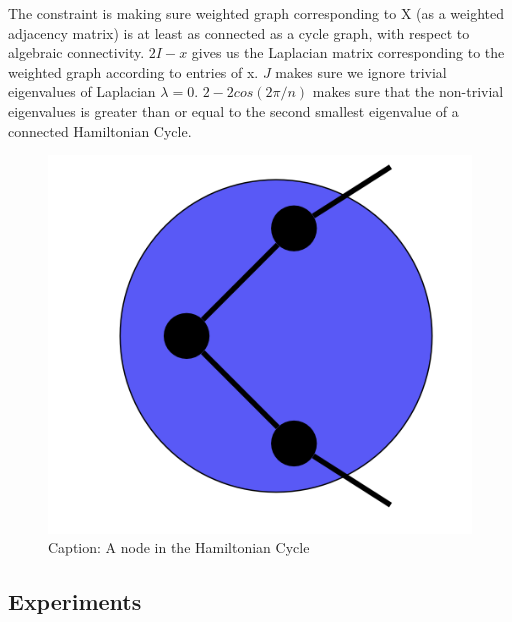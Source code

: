 \documentclass{article}
\begin{document}
The constraint is making sure weighted graph corresponding to X (as a weighted adjacency matrix) is at least as connected as a cycle graph, with respect to algebraic connectivity. $2I-x$ gives us the Laplacian matrix corresponding to the weighted graph according to entries of x. $J$ makes sure we ignore trivial eigenvalues of Laplacian $\lambda = 0$. $2-2cos(2\pi/n)$ makes sure that the non-trivial eigenvalues is greater than or equal to the second smallest eigenvalue of a connected Hamiltonian Cycle.
\begin{figure}[!ht]
    \centering
    \includegraphics{assets/degrees.png}
    \caption{Caption: A node in the Hamiltonian Cycle}
    \label{fig:degrees}
\end{figure}

\subsection{Experiments}
\end{document}
